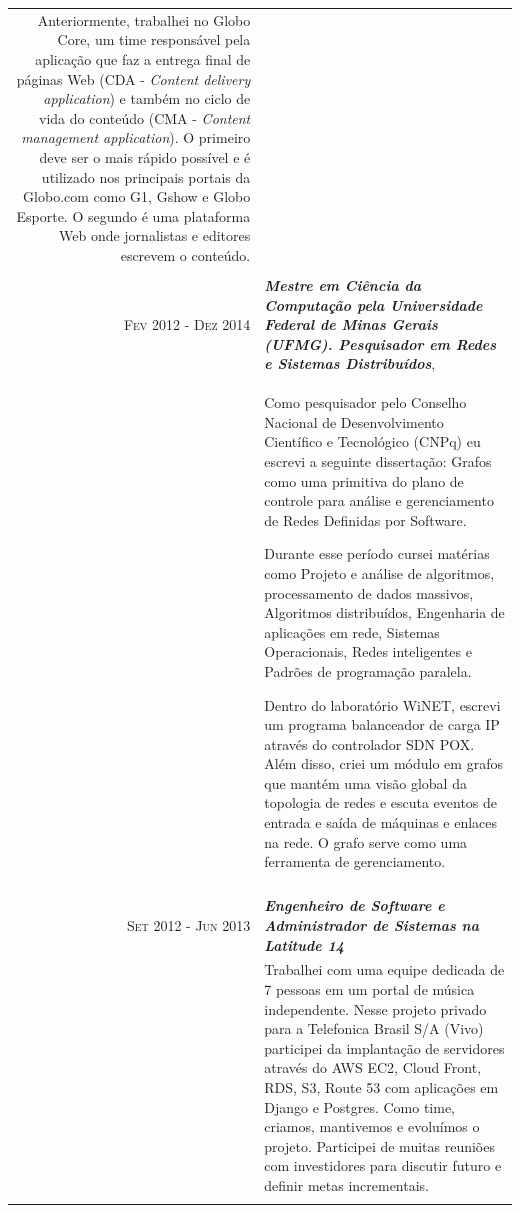\documentclass[a4paper,10pt]{article} %
\begin{document}
\begin{longtable}{r|p{11cm}}
{    Anteriormente, trabalhei no Globo Core, um time responsável pela aplicação
    que faz a entrega final de páginas Web (CDA - \emph{Content delivery
    application}) e também no ciclo de vida do conteúdo (CMA - \emph{Content
    management application}). O primeiro deve ser o mais rápido possível e
    é utilizado nos principais portais da Globo.com como G1, Gshow e Globo
    Esporte. O segundo é uma plataforma Web onde jornalistas e editores
    escrevem o conteúdo.} \\
\multicolumn{2}{c}{} \\

\textsc{Fev 2012 - Dez 2014} & \emph{\bf Mestre em Ciência da Computação pela
    Universidade Federal de Minas Gerais (UFMG). Pesquisador em
Redes e Sistemas Distribuídos}, \\
& \footnotesize{Como pesquisador pelo Conselho Nacional de Desenvolvimento
    Científico e Tecnológico (CNPq) eu escrevi a seguinte dissertação: Grafos
    como uma primitiva do plano de controle para análise e gerenciamento de
    Redes Definidas por Software.

    Durante esse período cursei matérias como Projeto e análise de algoritmos,
    processamento de dados massivos, Algoritmos distribuídos, Engenharia de
    aplicações em rede, Sistemas Operacionais, Redes inteligentes e Padrões de
    programação paralela.

    Dentro do laboratório WiNET, escrevi um programa balanceador de carga IP
    através do controlador SDN POX. Além disso, criei um módulo em grafos que
    mantém uma visão global da topologia de redes e escuta eventos de entrada
    e saída de máquinas e enlaces na rede. O grafo serve como uma ferramenta de
    gerenciamento.} \\
\multicolumn{2}{c}{} \\

\textsc{Set 2012 - Jun 2013} & \emph{\bf Engenheiro de Software e Administrador
de Sistemas na Latitude 14} \\
& \footnotesize{Trabalhei com uma equipe dedicada de 7 pessoas em um portal de
    música independente. Nesse projeto privado para a Telefonica Brasil S/A
    (Vivo) participei da implantação de servidores através do AWS EC2, Cloud
    Front, RDS, S3, Route 53 com aplicações em Django e Postgres. Como time,
    criamos, mantivemos e evoluímos o projeto. Participei de muitas reuniões
    com investidores para discutir futuro e definir metas incrementais.} \\
\multicolumn{2}{c}{} \\


\end{longtable}
\end{document}
